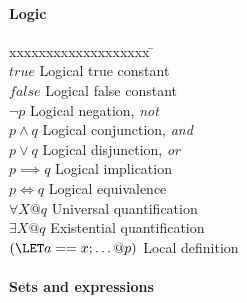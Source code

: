 \newpage

\paragraph{Logic}

\begin{tabbing}
xxxxxxxxxxxxxxxxxxx \= \kill \\ 
$true$ \> Logical true constant \\
$false$ \> Logical false constant \\
$\lnot p$ \> Logical negation, {\em not} \\
$p \land q$ \> Logical conjunction, {\em and} \\
$p \lor q$ \> Logical disjunction, {\em or} \\
$p \implies q$ \> Logical implication \\
$p \iff q$ \> Logical equivalence \\
$\forall X @ q$ \> Universal quantification \\
$\exists X @ q$ \> Existential quantification \\
$(\LET a == x; \dots @ p)$ \> Local definition \\
\end{tabbing}

\paragraph{Sets and expressions}

